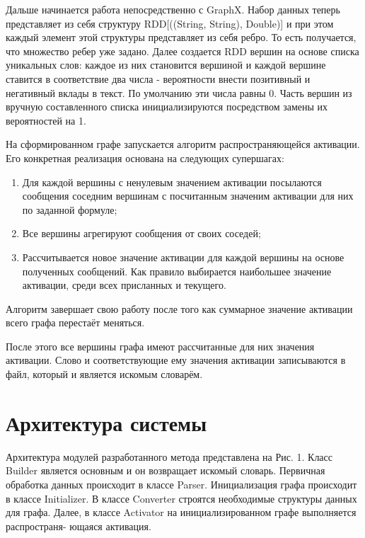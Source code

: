 Дальше начинается работа непосредственно с GraphX. Набор данных теперь
представляет из себя структуру RDD[((String, String), Double)] и при этом каждый
элемент этой структуры представляет из себя ребро. То есть получается, что
множество ребер уже задано. Далее создается RDD вершин на основе списка
уникальных слов: каждое из них становится вершиной и каждой вершине ставится в
соответствие два числа - вероятности внести позитивный и негативный вклады в
текст. По умолчанию эти числа равны 0. Часть вершин из вручную составленного списка
инициализируются посредством замены их вероятностей на 1. 

На сформированном графе запускается алгоритм распространяющейся активации. Его
конкретная реализация основана на следующих супершагах:

\begin{enumerate}
  \item Для каждой вершины с ненулевым значением активации посылаются сообщения
    соседним вершинам с посчитанным значеним активации для них по заданной
    формуле;
  \item Все вершины агрегируют сообщения от своих соседей;
  \item Рассчитывается новое значение активации для каждой вершины на основе
    полученных сообщений. Как правило выбирается наибольшее значение активации,
    среди всех присланных и текущего.
\end{enumerate}

Алгоритм завершает свою работу после того как суммарное значение активации
всего графа перестаёт меняться.

После этого все вершины графа имеют рассчитанные для них значения активации.
Слово и соответствующие ему значения активации записываются в файл,
который и является искомым словарём. 

\section{Архитектура системы}
Архитектура модулей разработанного метода представлена на Рис. 1. Класс
Builder является основным и он возвращает искомый словарь. Первичная обработка
данных происходит в классе Parser. Инициализация графа происходит в классе
Initializer. В классе Converter строятся необходимые структуры данных для графа.
Далее, в классе Activator на инициализированном графе выполняется распространя-
ющаяся активация.


\FloatBarrier

